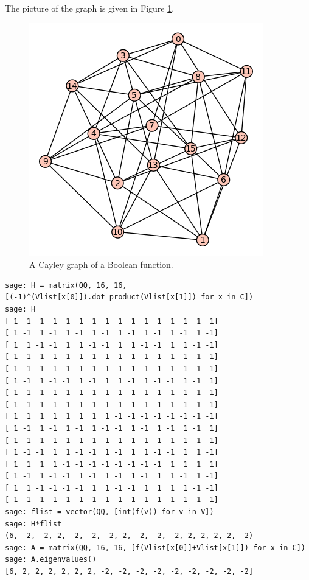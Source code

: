 The picture of the graph is given in Figure \ref{fig:distance_connectivity:bent-fcns-cayley-graphs1}.

\begin{figure}[!htbp]
\centering
{}
\includegraphics{image/distance-connectivity/bent-fcns-cayley-graphs1}
\caption{A Cayley graph of a Boolean function.}
\label{fig:distance_connectivity:bent-fcns-cayley-graphs1}
\end{figure}

\begin{lstlisting}
sage: H = matrix(QQ, 16, 16, [(-1)^(Vlist[x[0]]).dot_product(Vlist[x[1]]) for x in C])
sage: H
[ 1  1  1  1  1  1  1  1  1  1  1  1  1  1  1  1]
[ 1 -1  1 -1  1 -1  1 -1  1 -1  1 -1  1 -1  1 -1]
[ 1  1 -1 -1  1  1 -1 -1  1  1 -1 -1  1  1 -1 -1]
[ 1 -1 -1  1  1 -1 -1  1  1 -1 -1  1  1 -1 -1  1]
[ 1  1  1  1 -1 -1 -1 -1  1  1  1  1 -1 -1 -1 -1]
[ 1 -1  1 -1 -1  1 -1  1  1 -1  1 -1 -1  1 -1  1]
[ 1  1 -1 -1 -1 -1  1  1  1  1 -1 -1 -1 -1  1  1]
[ 1 -1 -1  1 -1  1  1 -1  1 -1 -1  1 -1  1  1 -1]
[ 1  1  1  1  1  1  1  1 -1 -1 -1 -1 -1 -1 -1 -1]
[ 1 -1  1 -1  1 -1  1 -1 -1  1 -1  1 -1  1 -1  1]
[ 1  1 -1 -1  1  1 -1 -1 -1 -1  1  1 -1 -1  1  1]
[ 1 -1 -1  1  1 -1 -1  1 -1  1  1 -1 -1  1  1 -1]
[ 1  1  1  1 -1 -1 -1 -1 -1 -1 -1 -1  1  1  1  1]
[ 1 -1  1 -1 -1  1 -1  1 -1  1 -1  1  1 -1  1 -1]
[ 1  1 -1 -1 -1 -1  1  1 -1 -1  1  1  1  1 -1 -1]
[ 1 -1 -1  1 -1  1  1 -1 -1  1  1 -1  1 -1 -1  1]
sage: flist = vector(QQ, [int(f(v)) for v in V])
sage: H*flist
(6, -2, -2, 2, -2, -2, -2, 2, -2, -2, -2, 2, 2, 2, 2, -2)
sage: A = matrix(QQ, 16, 16, [f(Vlist[x[0]]+Vlist[x[1]]) for x in C])
sage: A.eigenvalues()
[6, 2, 2, 2, 2, 2, 2, -2, -2, -2, -2, -2, -2, -2, -2, -2]
\end{lstlisting}

